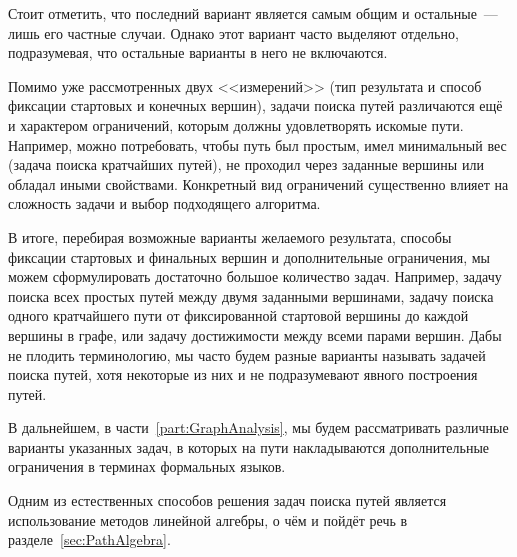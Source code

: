 Стоит отметить, что последний вариант является самым общим и остальные~--- лишь его частные случаи.
Однако этот вариант часто выделяют отдельно, подразумевая, что остальные варианты в него не включаются.

Помимо уже рассмотренных двух <<измерений>> (тип результата и способ фиксации стартовых и конечных вершин), задачи поиска путей различаются ещё и характером ограничений, которым должны удовлетворять искомые пути.
Например, можно потребовать, чтобы путь был простым, имел минимальный вес (задача поиска кратчайших путей), не проходил через заданные вершины или обладал иными свойствами.
Конкретный вид ограничений существенно влияет на сложность задачи и выбор подходящего алгоритма.

В итоге, перебирая возможные варианты желаемого результата, способы фиксации стартовых и финальных вершин и дополнительные ограничения, мы можем сформулировать достаточно большое количество задач.
Например, задачу поиска всех простых путей между двумя заданными вершинами, задачу поиска одного кратчайшего пути от фиксированной стартовой вершины до каждой вершины в графе, или задачу достижимости между всеми парами вершин.
Дабы не плодить терминологию, мы часто будем разные варианты называть задачей поиска путей, хотя некоторые из них и не подразумевают явного построения путей.

В дальнейшем, в части~\ref{part:GraphAnalysis}, мы будем рассматривать различные варианты указанных задач, в которых на пути накладываются дополнительные ограничения в терминах формальных языков.

Одним из естественных способов решения задач поиска путей является использование методов линейной алгебры, о чём и пойдёт речь в разделе~\ref{sec:PathAlgebra}.
